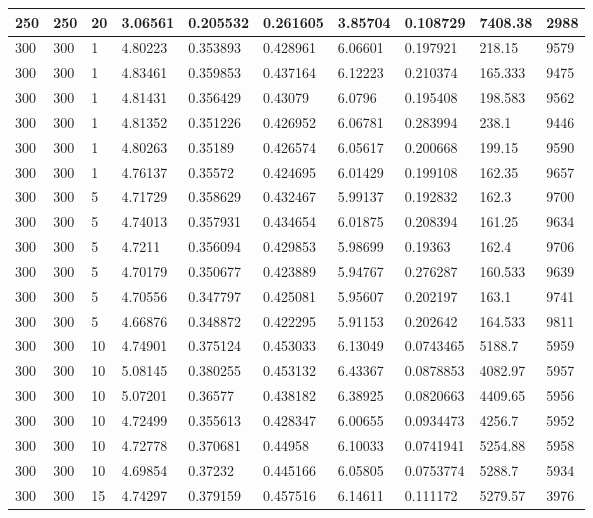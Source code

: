 \begin{landscape}
\begin{longtable}{ | l | l | l | l | l | l | l | l | l | l | }
250 & 250 & 20 & 3.06561 & 0.205532 & 0.261605 & 3.85704 & 0.108729 & 7408.38 & 2988\\ \hline
300 & 300 & 1 & 4.80223 & 0.353893 & 0.428961 & 6.06601 & 0.197921 & 218.15 & 9579\\ \hline
300 & 300 & 1 & 4.83461 & 0.359853 & 0.437164 & 6.12223 & 0.210374 & 165.333 & 9475\\ \hline
300 & 300 & 1 & 4.81431 & 0.356429 & 0.43079 & 6.0796 & 0.195408 & 198.583 & 9562\\ \hline
300 & 300 & 1 & 4.81352 & 0.351226 & 0.426952 & 6.06781 & 0.283994 & 238.1 & 9446\\ \hline
300 & 300 & 1 & 4.80263 & 0.35189 & 0.426574 & 6.05617 & 0.200668 & 199.15 & 9590\\ \hline
300 & 300 & 1 & 4.76137 & 0.35572 & 0.424695 & 6.01429 & 0.199108 & 162.35 & 9657\\ \hline
300 & 300 & 5 & 4.71729 & 0.358629 & 0.432467 & 5.99137 & 0.192832 & 162.3 & 9700\\ \hline
300 & 300 & 5 & 4.74013 & 0.357931 & 0.434654 & 6.01875 & 0.208394 & 161.25 & 9634\\ \hline
300 & 300 & 5 & 4.7211 & 0.356094 & 0.429853 & 5.98699 & 0.19363 & 162.4 & 9706\\ \hline
300 & 300 & 5 & 4.70179 & 0.350677 & 0.423889 & 5.94767 & 0.276287 & 160.533 & 9639\\ \hline
300 & 300 & 5 & 4.70556 & 0.347797 & 0.425081 & 5.95607 & 0.202197 & 163.1 & 9741\\ \hline
300 & 300 & 5 & 4.66876 & 0.348872 & 0.422295 & 5.91153 & 0.202642 & 164.533 & 9811\\ \hline
300 & 300 & 10 & 4.74901 & 0.375124 & 0.453033 & 6.13049 & 0.0743465 & 5188.7 & 5959\\ \hline
300 & 300 & 10 & 5.08145 & 0.380255 & 0.453132 & 6.43367 & 0.0878853 & 4082.97 & 5957\\ \hline
300 & 300 & 10 & 5.07201 & 0.36577 & 0.438182 & 6.38925 & 0.0820663 & 4409.65 & 5956\\ \hline
300 & 300 & 10 & 4.72499 & 0.355613 & 0.428347 & 6.00655 & 0.0934473 & 4256.7 & 5952\\ \hline
300 & 300 & 10 & 4.72778 & 0.370681 & 0.44958 & 6.10033 & 0.0741941 & 5254.88 & 5958\\ \hline
300 & 300 & 10 & 4.69854 & 0.37232 & 0.445166 & 6.05805 & 0.0753774 & 5288.7 & 5934\\ \hline
300 & 300 & 15 & 4.74297 & 0.379159 & 0.457516 & 6.14611 & 0.111172 & 5279.57 & 3976\\ \hline

\end{longtable}
\end{landscape}
